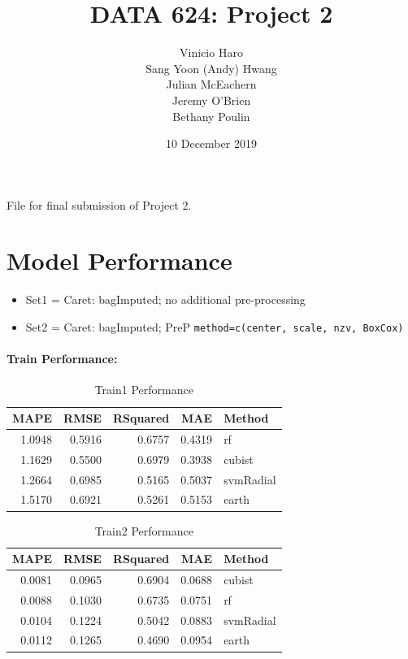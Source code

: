 \documentclass[]{report}
\title{DATA 624: Project 2}
\author{Vinicio Haro \\ Sang Yoon (Andy) Hwang \\ Julian McEachern \\ Jeremy O'Brien \\ Bethany Poulin}
\date{10 December 2019}
\providecommand{\tightlist}{%
  \setlength{\itemsep}{0pt}\setlength{\parskip}{0pt}}
\begin{document}
\maketitle

{
\setcounter{tocdepth}{1}
\tableofcontents
}
File for final submission of Project 2.

\hypertarget{model-performance}{%
\chapter{Model Performance}\label{model-performance}}

\begin{itemize}
\tightlist
\item
  Set1 = Caret: bagImputed; no additional pre-processing\\
\item
  Set2 = Caret: bagImputed; PreP
  \texttt{method=c(\textquotesingle{}center\textquotesingle{},\ \textquotesingle{}scale\textquotesingle{},\ \textquotesingle{}nzv\textquotesingle{},\ \textquotesingle{}BoxCox\textquotesingle{})}
\end{itemize}

\hypertarget{train-performance}{%
\subsubsection{Train Performance:}\label{train-performance}}

\begin{table}[H]

\caption{\label{tab:unnamed-chunk-1}Train1 Performance}
\centering
\fontsize{8}{10}\selectfont
\begin{tabular}{rrrrl}
\toprule
MAPE & RMSE & RSquared & MAE & Method\\
\midrule
\rowcolor{gray!6}  1.0948 & 0.5916 & 0.6757 & 0.4319 & rf\\
1.1629 & 0.5500 & 0.6979 & 0.3938 & cubist\\
\rowcolor{gray!6}  1.2664 & 0.6985 & 0.5165 & 0.5037 & svmRadial\\
1.5170 & 0.6921 & 0.5261 & 0.5153 & earth\\
\bottomrule
\end{tabular}
\end{table}

\begin{table}[H]

\caption{\label{tab:unnamed-chunk-1}Train2 Performance}
\centering
\fontsize{8}{10}\selectfont
\begin{tabular}{rrrrl}
\toprule
MAPE & RMSE & RSquared & MAE & Method\\
\midrule
\rowcolor{gray!6}  0.0081 & 0.0965 & 0.6904 & 0.0688 & cubist\\
0.0088 & 0.1030 & 0.6735 & 0.0751 & rf\\
\rowcolor{gray!6}  0.0104 & 0.1224 & 0.5042 & 0.0883 & svmRadial\\
0.0112 & 0.1265 & 0.4690 & 0.0954 & earth\\
\bottomrule
\end{tabular}
\end{table}
\end{document}
